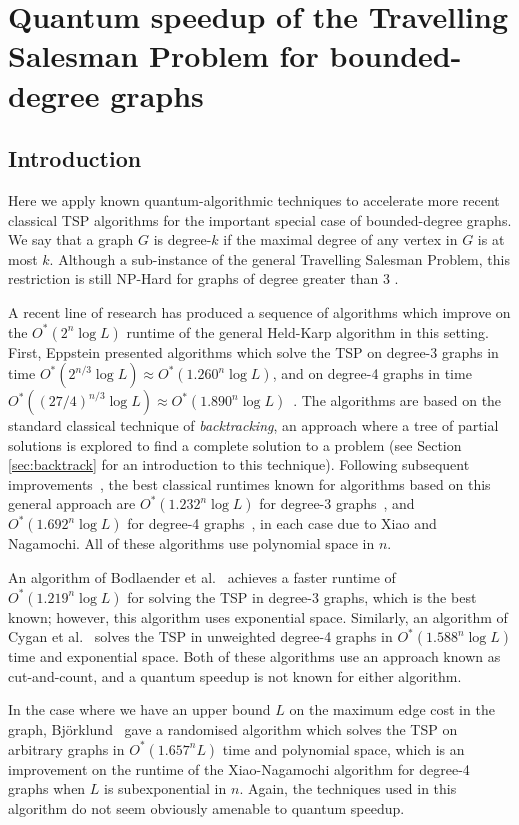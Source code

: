 \chapter{Quantum speedup of the Travelling Salesman Problem for bounded-degree graphs}
\label{chp:tsp}

\section{Introduction}

Here we apply known quantum-algorithmic techniques to accelerate more recent classical TSP algorithms for the important special case of bounded-degree graphs. We say that a graph $G$ is degree-$k$ if the maximal degree of any vertex in $G$ is at most $k$. Although a sub-instance of the general Travelling Salesman Problem, this restriction is still NP-Hard for graphs of degree greater than 3 \cite{akiyama1980}.

A recent line of research has produced a sequence of algorithms which improve on the $O^*(2^n\log L)$ runtime of the general Held-Karp algorithm in this setting. First, Eppstein presented algorithms which solve the TSP on degree-3 graphs in time $O^*(2^{n/3}\log L) \approx O^*(1.260^n\log L)$, and on degree-4 graphs in time $O^*((27/4)^{n/3}\log L) \approx O^*(1.890^n\log L)$~\cite{eppstein2007}. The algorithms are based on the standard classical technique of {\em backtracking}, an approach where a tree of partial solutions is explored to find a complete solution to a problem (see Section \ref{sec:backtrack} for an introduction to this technique). Following subsequent improvements~\cite{iwama2007,liskiewicz14}, the best classical runtimes known for algorithms based on this general approach are $O^*(1.232^n\log L)$ for degree-3 graphs~\cite{xiao2016degree3}, and $O^*(1.692^n\log L)$ for degree-4 graphs~\cite{xiao2016degree4}, in each case due to Xiao and Nagamochi. All of these algorithms use polynomial space in $n$.

An algorithm of Bodlaender et al.~\cite{bodlaender15} achieves a faster runtime of $O^*(1.219^n\log L)$ for solving the TSP in degree-3 graphs, which is the best known; however, this algorithm uses exponential space. Similarly, an algorithm of Cygan et al.~\cite{cygan11} solves the TSP in unweighted degree-4 graphs in $O^*(1.588^n\log L)$ time and exponential space. Both of these algorithms use an approach known as cut-and-count, and a quantum speedup is not known for either algorithm.

In the case where we have an upper bound $L$ on the maximum edge cost in the graph, Bj\"orklund~\cite{bjorklund14} gave a randomised algorithm which solves the TSP on arbitrary graphs in $O^*(1.657^n L)$ time and polynomial space, which is an improvement on the runtime of the Xiao-Nagamochi algorithm for degree-4 graphs when $L$ is subexponential in $n$. Again, the techniques used in this algorithm do not seem obviously amenable to quantum speedup.

